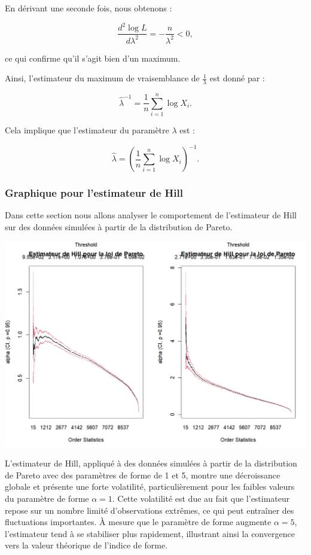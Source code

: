 \documentclass{article}
\begin{document}
En dérivant une seconde fois, nous obtenons :

\[
\frac{d^2 \log L}{d \lambda^2} = -\frac{n}{\lambda^2} < 0,
\]

ce qui confirme qu'il s'agit bien d'un maximum.  

Ainsi, l'estimateur du maximum de vraisemblance de \( \frac{1}{\lambda} \) est donné par :

\[
\hat{\lambda}^{-1} = \frac{1}{n} \sum_{i=1}^{n} \log X_i.
\]

Cela implique que l'estimateur du paramètre \( \lambda \) est :

\[
\hat{\lambda} = \left( \frac{1}{n} \sum_{i=1}^{n} \log X_i \right)^{-1}.
\]
\subsubsection{Graphique pour l'estimateur de Hill}
Dans cette section nous allons analyser le comportement de l'estimateur de Hill sur des données simulées à partir de la distribution de Pareto.
\begin{center}
	\includegraphics[scale=0.6]{./images/estimateur_hill_pareto.png} 
\end{center}
L'estimateur de Hill, appliqué à des données simulées à partir de la distribution de Pareto avec des paramètres de forme de 1 et 5, montre une décroissance globale et présente une forte volatilité, particulièrement pour les faibles valeurs du paramètre de forme \(\alpha = 1\). Cette volatilité est due au fait que l'estimateur repose sur un nombre limité d'observations extrêmes, ce qui peut entraîner des fluctuations importantes. À mesure que le paramètre de forme augmente \(\alpha = 5\), l'estimateur tend à se stabiliser plus rapidement, illustrant ainsi la convergence vers la valeur théorique de l'indice de forme.
\end{document}
